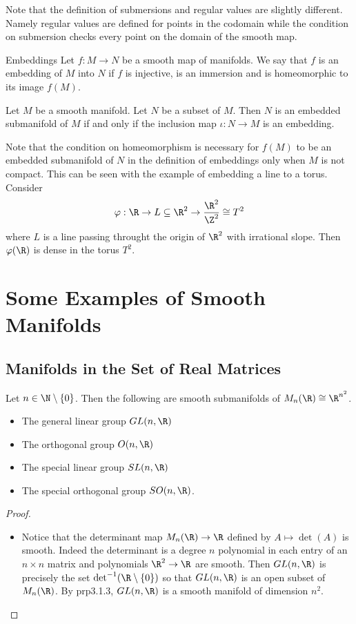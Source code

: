 \documentclass[a4paper]{article}
\begin{document}
Note that the definition of submersions and regular values are slightly different. Namely regular values are defined for points in the codomain while the condition on submersion checks every point on the domain of the smooth map. 

\begin{defn}{Embeddings}{} Let $f:M\to N$ be a smooth map of manifolds. We say that $f$ is an embedding of $M$ into $N$ if $f$ is injective, is an immersion and is homeomorphic to its image $f(M)$. 
\end{defn}

\begin{prp}{}{} Let $M$ be a smooth manifold. Let $N$ be a subset of $M$. Then $N$ is an embedded submanifold of $M$ if and only if the inclusion map $\iota:N\to M$ is an embedding. 
\end{prp}

Note that the condition on homeomorphism is necessary for $f(M)$ to be an embedded submanifold of $N$ in the definition of embeddings only when $M$ is not compact. This can be seen with the example of embedding a line to a torus. Consider $$\varphi:\R\to L\subseteq\R^2\to\frac{\R^2}{\Z^2}\cong T^2$$ where $L$ is a line passing throught the origin of $\R^2$ with irrational slope. Then $\varphi(\R)$ is dense in the torus $T^2$. 

\pagebreak
\section{Some Examples of Smooth Manifolds}
\subsection{Manifolds in the Set of Real Matrices}
\begin{prp}{}{} Let $n\in\N\setminus\{0\}$. Then the following are smooth submanifolds of $M_n(\R)\cong\R^{n^2}$. 
\begin{itemize}
\item The general linear group $GL(n,\R)$
\item The orthogonal group $O(n,\R)$
\item The special linear group $SL(n,\R)$
\item The special orthogonal group $SO(n,\R)$. 
\end{itemize} 
\begin{proof}~\\
\begin{itemize}
\item Notice that the determinant map $M_n(\R)\to\R$ defined by $A\mapsto\det(A)$ is smooth. Indeed the determinant is a degree $n$ polynomial in each entry of an $n\times n$ matrix and polynomials $\R^2\to\R$ are smooth. Then $GL(n,\R)$ is precisely the set $\det^{-1}(\R\setminus\{0\})$ so that $GL(n,\R)$ is an open subset of $M_n(\R)$. By prp3.1.3, $GL(n,\R)$ is a smooth manifold of dimension $n^2$. 
\end{itemize}
\end{proof}
\end{prp}
\end{document}
